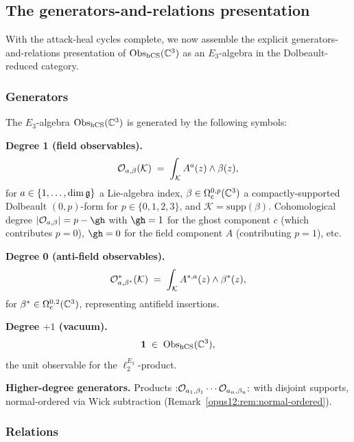 \subsection{The generators-and-relations presentation}
\label{opus12:sec:gen-rel}

With the attack-heal cycles complete, we now assemble the explicit
generators-and-relations presentation of $\mathrm{Obs}_{\mathrm{hCS}}(\mathbb{C}^3)$ as an
$E_3$-algebra in the Dolbeault-reduced category.

\subsubsection{Generators}

\begin{definition}\ClaimStatusDefinition
\label{opus12:def:full-generators}
The $E_3$-algebra $\mathrm{Obs}_{\mathrm{hCS}}(\mathbb{C}^3)$ is generated by the following
symbols:

\textbf{Degree 1 (field observables).}
\[
\mathcal{O}_{a, \beta}(\mathcal K) \;=\;
\int_\mathcal K A^a(z) \wedge \beta(z),
\]
for $a \in \{1, \ldots, \dim \mathfrak{g}\}$ a Lie-algebra index,
$\beta \in \Omega^{0, p}_{\mathrm{c}}(\mathbb{C}^3)$ a compactly-supported
Dolbeault $(0,p)$-form for $p \in \{0, 1, 2, 3\}$, and
$\mathcal K = \mathrm{supp}(\beta)$. Cohomological degree
$|\cO_{a, \beta}| = p - \gh$ with $\gh = 1$ for the ghost component $c$
(which contributes $p = 0$), $\gh = 0$ for the field component $A$
(contributing $p = 1$), etc.

\textbf{Degree 0 (anti-field observables).}
\[
\mathcal{O}^*_{a, \beta^*}(\mathcal K) \;=\;
\int_\mathcal K A^{*,a}(z) \wedge \beta^*(z),
\]
for $\beta^* \in \Omega^{0, 2}_{\mathrm{c}}(\mathbb{C}^3)$, representing
antifield insertions.

\textbf{Degree $+1$ (vacuum).}
\[
\mathbf{1} \;\in\; \mathrm{Obs}_{\mathrm{hCS}}(\mathbb{C}^3),
\]
the unit observable for the $\ell_2^{E_3}$-product.

\textbf{Higher-degree generators.} Products
${:} \mathcal{O}_{a_1, \beta_1} \cdots \mathcal{O}_{a_n, \beta_n} {:}$ with disjoint
supports, normal-ordered via Wick subtraction
(Remark~\ref{opus12:rem:normal-ordered}).
\end{definition}

\subsubsection{Relations}

